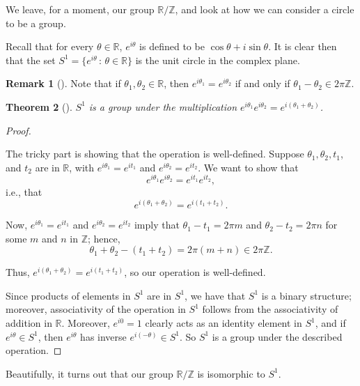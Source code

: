 \documentclass[10pt,]{book}
\theoremstyle{plain}
\newtheorem{theorem}{Theorem}[section]
\theoremstyle{definition}
\theoremstyle{definition}
\newtheorem{remark}[theorem]{Remark}
\theoremstyle{definition}
\theoremstyle{definition}
\numberwithin{equation}{section}
\def\Z{\mathbb{Z}}
\def\R{\mathbb{R}}
\begin{document}
\par
We leave, for a moment, our group \(\R/\Z\), and look at how we can consider a circle to be a group.%
\par
\label{notation-78}
 Recall that for every \(\theta \in \R\), \(e^{i\theta}\) is defined to be \(\cos \theta + i\sin \theta\). It is clear then that the set \(S^1=\{e^{i\theta} \,:\, \theta\in
\R\}\) is the unit circle in the complex plane.%
\begin{remark}[]\label{remark-43}
Note that if \(\theta_1, \theta_2\in \R\), then \(e^{i\theta_1}=e^{i\theta_2}\) if and only if \(\theta_1-\theta_2
\in 2\pi \Z\).%
\end{remark}
\begin{theorem}[{}]\label{theorem-68}
\(S^1\) is a group under the multiplication \(e^{i\theta_1}e^{i\theta_2}=e^{i(\theta_1+\theta_2)}\).%
\end{theorem}
\begin{proof}\hypertarget{proof-57}{}
The tricky part is showing that the operation is well-defined. Suppose \(\theta_1, \theta_2, t_1\), and \(t_2\) are in \(\R\), with \(e^{i\theta_1}=e^{it_1}\) and \(e^{i\theta_2}=e^{it_2}\). We want to show that%
\begin{equation*}
e^{i\theta_1}e^{i\theta_2}=e^{it_1}e^{it_2},
\end{equation*}
i.e., that%
\begin{equation*}
e^{i(\theta_1+\theta_2)}=e^{i(t_1+t_2)}.
\end{equation*}
%
\par
Now, \(e^{i\theta_1}=e^{it_1}\) and \(e^{i\theta_2}=e^{it_2}\) imply that \(\theta_1 -t_1 = 2\pi m\) and \(\theta_2-t_2 = 2\pi n\) for some \(m\) and \(n\) in \(\Z\); hence,%
\begin{equation*}
\theta_1+\theta_2-(t_1+t_2)= 2\pi(m+n) \in 2\pi\Z.
\end{equation*}
%
\par
Thus, \(e^{i(\theta_1+\theta_2)}=e^{i(t_1+t_2)}\), so our operation is well-defined.%
\par
Since products of elements in \(S^1\) are in \(S^1\), we have that \(S^1\) is a binary structure; moreover, associativity of the operation in \(S^1\) follows from the associativity of addition in \(\R\). Moreover, \(e^{i0}=1\) clearly acts as an identity element in \(S^1\), and if \(e^{i\theta}\in S^1\), then \(e^{i\theta}\) has inverse \(e^{i(-\theta)} \in S^1\). So \(S^1\) is a group under the described operation.%
\end{proof}
Beautifully, it turns out that our group \(\R/\Z\) is isomorphic to \(S^1\).%
\end{document}
